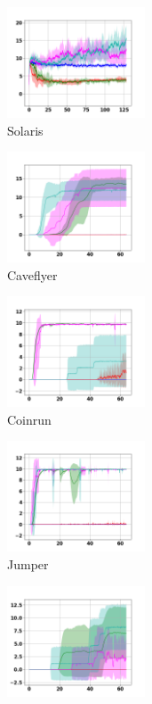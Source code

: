 \documentclass[a4paper,11pt]{elsarticle}
\begin{document}
\begin{figure}[t!]
\begin{subfigure}[b]{0.32\textwidth}
    \centering
    \includegraphics[width=4.1cm]{fig/results/solaris.png}
    \caption{Solaris}
    \label{fig:res2f}
  \end{subfigure}
    \begin{subfigure}[b]{0.32\textwidth}
    \centering
    \includegraphics[width=4.1cm]{fig/results/caveflyer.png}
    \caption{Caveflyer}
    \label{fig:res2g}
  \end{subfigure}
    \begin{subfigure}[b]{0.32\textwidth}
    \centering
    \includegraphics[width=4.1cm]{fig/results/coinrun.png}
    \caption{Coinrun}
    \label{fig:res2h}
  \end{subfigure}
    \begin{subfigure}[b]{0.32\textwidth}
    \centering
    \includegraphics[width=4.1cm]{fig/results/jumper.png}
    \caption{Jumper}
    \label{fig:res2i}
  \end{subfigure}
    \begin{subfigure}[b]{0.32\textwidth}
    \centering
    \includegraphics[width=4.1cm]{fig/results/climber.png}

\end{subfigure}
\end{figure}
\end{document}
